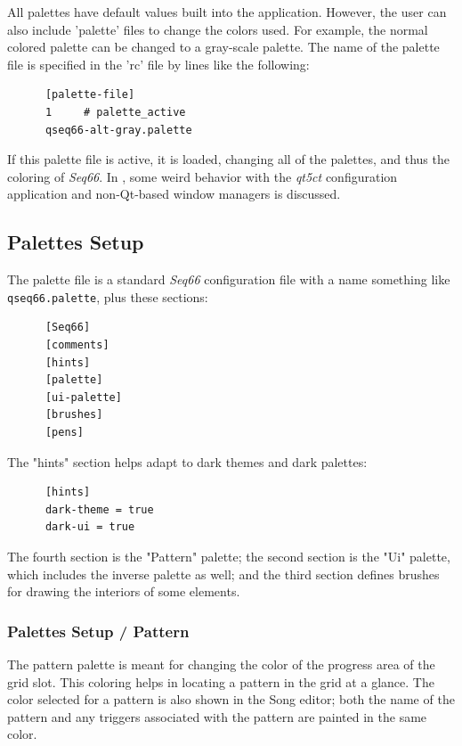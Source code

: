    All palettes have default values built into the application.  However, the
   user can also include 'palette' files to change the colors used.  For
   example, the normal colored palette can be changed to a gray-scale palette.
   The name of the palette file is specified in the 'rc' file by lines like the
   following:

   \begin{verbatim}
      [palette-file]
      1     # palette_active
      qseq66-alt-gray.palette
   \end{verbatim}

   If this palette file is active, it is loaded, changing all of the palettes,
   and thus the coloring of \textsl{Seq66}.
   In , some weird behavior with
   the \textsl{qt5ct} configuration application and non-Qt-based window managers
   is discussed.

\subsection{Palettes Setup}
\label{subsec:palettes_setup}

   The palette file is a standard \textsl{Seq66} configuration file with a name
   something like \texttt{qseq66.palette}, plus these sections:

   \begin{verbatim}
      [Seq66]
      [comments]
      [hints]
      [palette]
      [ui-palette]
      [brushes]
      [pens]
   \end{verbatim}

   The "hints" section helps adapt to dark themes and dark palettes:

   \begin{verbatim}
      [hints]
      dark-theme = true
      dark-ui = true
   \end{verbatim}

   The fourth section is the "Pattern" palette; the second section is the
   "Ui" palette, which includes the inverse palette as well; and the third
   section defines brushes for drawing the interiors of some elements.

\subsubsection{Palettes Setup / Pattern}
\label{subsubsec:palettes_setup_pattern}

   The pattern palette is meant for changing the color of the progress
   area of the grid slot.
   This coloring helps in locating a pattern in the grid at a glance.
   The color selected for a pattern is also shown in the Song editor;
   both the name of the pattern and any triggers associated with the pattern
   are painted in the same color.


